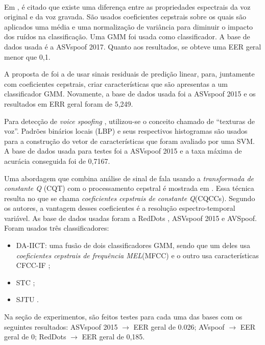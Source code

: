 \documentclass[a4paper,12pt,openright,oneside]{book}
\newenvironment{myenv}[1]
{\begin{spacing}{#1}}
	{\end{spacing}}
\begin{document}
\begin{myenv}{1.5}
\\
\par Em \cite{8725688}, é citado que existe uma diferença entre as propriedades espectrais da voz original e da voz gravada. São usados coeficientes cepstrais sobre os quais são aplicados uma média e uma normalização de variância para diminuir o impacto dos ruídos na classificação. Uma GMM foi usada como classificador. A base de dados usada é a ASVspoof 2017. Quanto aos resultados, se obteve uma EER geral menor que 0,1.
\\
\par A proposta de \cite{Hanilci2018} foi a de usar sinais residuais de predição linear, para, juntamente com coeficientes cepstrais, criar características que são apresentas a um classificador GMM. Novamente, a base de dados usada foi a ASVspoof 2015 e os resultados em ERR geral foram de 5,249.
\\
\par Para detecção de \textit{voice spoofing} \cite{ISI:000473343500086}, utilizou-se o conceito chamado de ``texturas de voz''. Padrões binários locais (LBP) e seus respectivos histogramas são usados para a construção do vetor de características que foram avaliado por uma SVM. A base de dados usada para testes foi a ASVspoof 2015 e a taxa máxima de acurácia conseguida foi de 0,7167.
\\
\par Uma abordagem que combina análise de sinal de fala usando a \textit{transformada de constante Q} (CQT) com o processamento cepstral é mostrada em \cite{TODISCO2017516}. Essa técnica resulta no que se chama \textit{coeficientes cepstrais de constante Q}(CQCCs). Segundo os autores, a vantagem desses coeficientes é a resolução espectro-temporal variável. As base de dados usadas foram a RedDots \cite{redDots}, ASVspoof 2015 e AVSpoof. Foram usados três classificadores:
\begin{itemize}
\item DA-IICT: uma fusão de dois classificadores GMM, sendo que um deles usa \textit{coeficientes cepstrais de frequência MEL}(MFCC) e o outro usa características CFCC-IF \cite{Patel2015};
\item STC \cite{7472724};
\item SJTU \cite{korshunov2016overview}.
\end{itemize}			
Na seção de experimentos, são feitos testes para cada uma das bases com os seguintes resultados: ASVspoof 2015 $\rightarrow$ EER geral de 0.026; AVspoof $\rightarrow$ EER geral de 0; RedDots $\rightarrow$ EER geral de 0,185.

\end{myenv}
\end{document}
